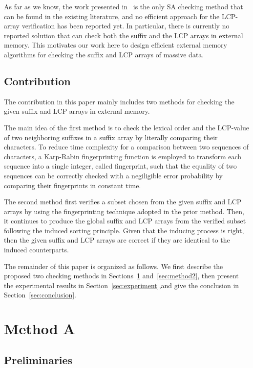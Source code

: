 \documentclass[10pt,journal,compsoc]{IEEEtran}
\begin{document}
As far as we know, the work presented in~\cite{Burkhardt2003} is the only SA checking method that can be found in the existing literature, and no efficient approach for the LCP-array verification has been reported yet. In particular, there is currently no reported solution that can check both the suffix and the LCP arrays in external memory. This motivates our work here to design efficient external memory algorithms for checking the suffix and LCP arrays of massive data.
	
\subsection{Contribution}\label{sec:introduction:contribution}

The contribution in this paper mainly includes two methods for checking the given suffix and LCP arrays in external memory. 

The main idea of the first method is to check the lexical order and the LCP-value of two neighboring suffixes in a suffix array by literally comparing their characters. To reduce time complexity for a comparison between two sequences of characters, a Karp-Rabin fingerprinting function is employed to transform each sequence into a single integer, called fingerprint, such that the equality of two sequences can be correctly checked with a negiligible error probability by comparing their fingerprints in constant time.

The second method first verifies a subset chosen from the given suffix and LCP arrays by using the fingerprinting technique adopted in the prior method. Then, it continues to produce the global suffix and LCP arrays from the verified subset following the induced sorting principle. Given that the inducing process is right, then the given suffix and LCP arrays are correct if they are identical to the induced counterparts. 

The remainder of this paper is organized as follows. We first describe the proposed two checking methods in Sections~\ref{sec:method1} and~\ref{sec:method2}, then present the experimental results in Section~\ref{sec:experiment},and give the conclusion in Section~\ref{sec:conclusion}.


\section{Method A} \label{sec:method1}

\subsection{Preliminaries} \label{sec:method1:notations}
\end{document}
